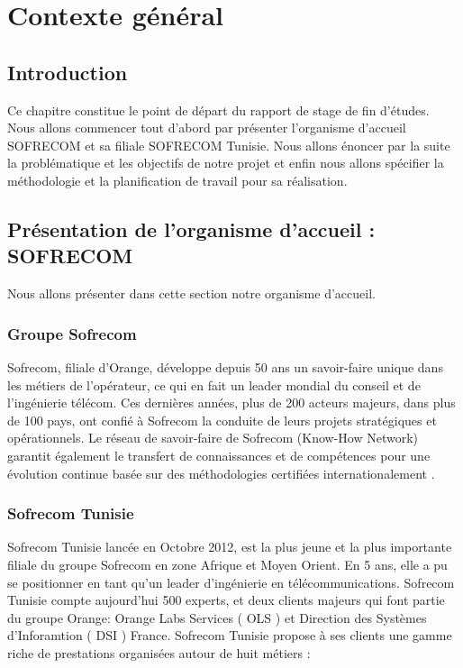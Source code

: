 
\chapter{Contexte général}
\section*{Introduction}
Ce chapitre constitue le point de départ du rapport de stage de fin d'études. Nous allons commencer tout d’abord par présenter l'organisme d'accueil SOFRECOM et sa filiale SOFRECOM Tunisie. Nous allons énoncer par la suite la problématique et les objectifs de notre projet et enfin nous allons spécifier la méthodologie et la planification de travail pour sa réalisation.



\section[Présentation de l'organisme d'accueil : SOFRECOM]{Présentation de l'organisme d'accueil : SOFRECOM }
Nous allons présenter dans cette section notre organisme d'accueil.
    \subsection{Groupe Sofrecom}
    Sofrecom, filiale d’Orange, développe depuis 50 ans un savoir-faire unique dans les métiers de l’opérateur, ce qui en fait un leader mondial du conseil et de l’ingénierie télécom. Ces dernières années, plus de 200 acteurs majeurs, dans plus de 100 pays, ont confié à Sofrecom la conduite de leurs projets stratégiques et opérationnels. Le réseau de savoir-faire de Sofrecom (Know-How Network) garantit également le transfert de connaissances et de compétences pour une évolution continue basée sur des méthodologies certifiées internationalement \cite{Sofrecom}.
     \subsection{Sofrecom Tunisie }
     Sofrecom Tunisie lancée en Octobre 2012, est la plus jeune et la plus importante filiale du groupe Sofrecom en zone Afrique et Moyen Orient. En 5 ans, elle a pu se positionner en tant qu’un leader d’ingénierie en télécommunications. Sofrecom Tunisie compte aujourd’hui 500 experts, et deux clients majeurs qui font partie du groupe Orange:  Orange Labs Services ( OLS ) et Direction des Systèmes d'Inforamtion ( DSI ) France. Sofrecom Tunisie propose à ses clients une gamme riche de prestations organisées autour de huit métiers \cite{SofrecomTunisie} :
     
